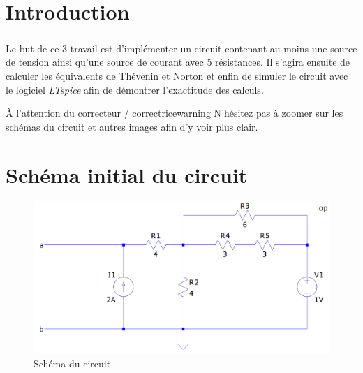 \section{Introduction}

    \subparagraph{}Le but de ce {\color{info}3\ieme{} travail} est d'implémenter un circuit contenant au moins une source de tension ainsi qu'une source de courant avec 
    5 résistances. Il s'agira ensuite de calculer les équivalents de Thévenin et Norton et enfin de simuler le circuit avec le logiciel \textit{LTspice}
    afin de démontrer l'exactitude des calculs.\\[1.5cm]
    
    \begin{titletbox}{À l'attention du correcteur / correctrice}{warning}
        N'hésitez pas à zoomer sur les schémas du circuit et autres images afin d'y voir plus clair.
    \end{titletbox}

\section{Schéma initial du circuit}

    \begin{figure}[H]
        \centering
        \includegraphics[scale=0.5]{../pictures/circuit.png} %
        \caption{Schéma du circuit}
    \end{figure}

